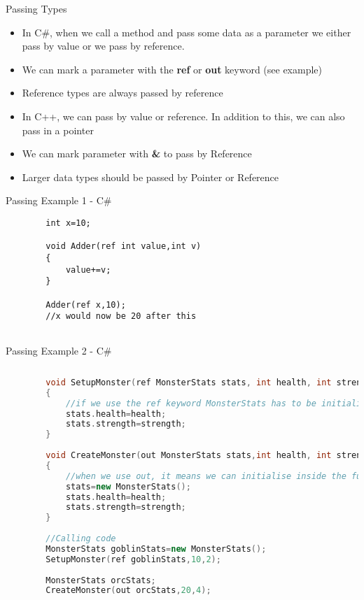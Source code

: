 \begin{frame}{Passing Types}
	\begin{itemize}
		\pause \item In C\#, when we call a method and pass some data as a parameter we either pass by value or we pass by reference. 
		\pause \item We can mark a parameter with the \textbf{ref} or \textbf{out} keyword (see example)
		\pause \item Reference types are always passed by reference
		\pause \item In C++, we can pass by value or reference. In addition to this, we can also pass in a pointer
		\pause \item We can mark parameter with \textbf{\&} to pass by Reference 
		\pause \item Larger data types should be passed by Pointer or Reference
	\end{itemize}
\end{frame}

\begin{frame}[fragile]{Passing Example 1 - C\#}
	\begin{lstlisting}
		int x=10;
		
		void Adder(ref int value,int v)
		{
			value+=v;	
		}
		
		Adder(ref x,10);
		//x would now be 20 after this		
	
	\end{lstlisting}
\end{frame}

\begin{frame}[fragile]{Passing Example 2 - C\#}
	\begin{lstlisting}[language=C++,basicstyle=\tiny,]
	
		void SetupMonster(ref MonsterStats stats, int health, int strength)
		{
			//if we use the ref keyword MonsterStats has to be initialised
			stats.health=health;
			stats.strength=strength;
		}
		
		void CreateMonster(out MonsterStats stats,int health, int strength)
		{
			//when we use out, it means we can initialise inside the function
			stats=new MonsterStats();
			stats.health=health;
			stats.strength=strength;
		}
		
		//Calling code
		MonsterStats goblinStats=new MonsterStats();
		SetupMonster(ref goblinStats,10,2);
		
		MonsterStats orcStats;
		CreateMonster(out orcStats,20,4);
	\end{lstlisting}
\end{frame}


